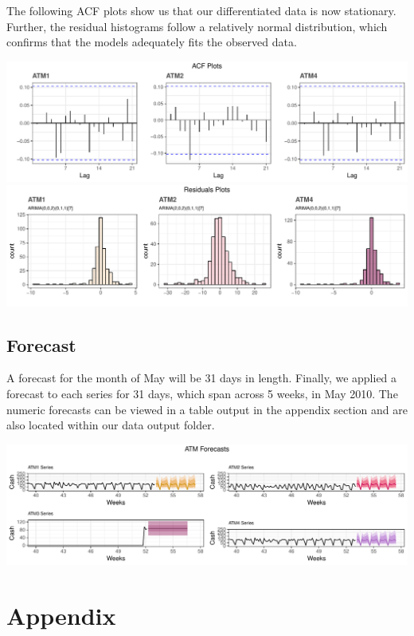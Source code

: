 \documentclass[openany]{book}
\begin{document}
The following ACF plots show us that our differentiated data is now
stationary. Further, the residual histograms follow a relatively normal
distribution, which confirms that the models adequately fits the
observed data.

\includegraphics{Part-A-JM_JO_files/figure-latex/unnamed-chunk-7-1.pdf}
\includegraphics{Part-A-JM_JO_files/figure-latex/unnamed-chunk-7-2.pdf}

\hypertarget{forecast}{%
\section{Forecast}\label{forecast}}

A forecast for the month of May will be 31 days in length. Finally, we
applied a forecast to each series for 31 days, which span across 5
weeks, in May 2010. The numeric forecasts can be viewed in a table
output in the appendix section and are also located within our data
output folder.

\includegraphics{Part-A-JM_JO_files/figure-latex/unnamed-chunk-8-1.pdf}

\hypertarget{Appendix}{%
\chapter*{Appendix}\label{Appendix}}
\end{document}
